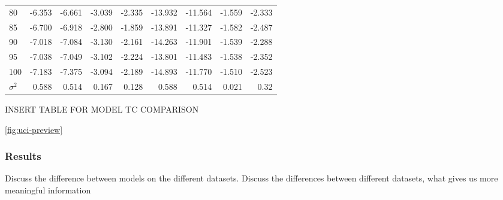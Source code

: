 \documentclass[letterpaper,12pt]{article}
\begin{document}
\begin{table}
\begin{center}
\begin{tabular}{| l |rr|rr|rr|rr|}
			80  & -6.353 & -6.661 & -3.039 & -2.335 & -13.932 & -11.564 & -1.559 & -2.333 \\
			85  & -6.700 & -6.918 & -2.800 & -1.859 & -13.891 & -11.327 & -1.582 & -2.487 \\
			90  & -7.018 & -7.084 & -3.130 & -2.161 & -14.263 & -11.901 & -1.539 & -2.288 \\
			95  & -7.038 & -7.049 & -3.102 & -2.224 & -13.801 & -11.483 & -1.538 & -2.352 \\
			100 & -7.183 & -7.375 & -3.094 & -2.189 & -14.893 & -11.770 & -1.510 & -2.523 \\
			\hline
			$\sigma^2$ & 0.588 & 0.514 & 0.167 & 0.128 & 0.588 & 0.514 & 0.021 & 0.32 \\
			\hline
			\end{tabular}
	\end{center}
\end{table}
INSERT TABLE FOR MODEL TC COMPARISON


\ref{fig:uci-preview}
\newpage
\subsubsection{Results}


Discuss the difference between models on the different datasets.
Discuss the differences between different datasets, what gives us more meaningful information
\end{document}
